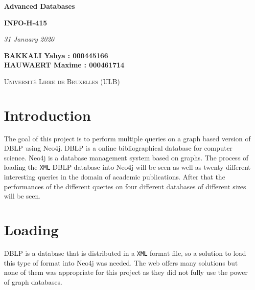 \documentclass{article}
\begin{document}
\begin{titlepage}
    \begin{center}
        \vspace*{1cm}


        \Huge
        \textbf{Advanced Databases}
        \vspace{0.25cm}

        \LARGE
        \textbf{INFO-H-415}

        \vspace{0.25cm}
        \LARGE

        \vspace{0.25cm}
        \textit{31 January 2020}

        \vspace{3cm}
           \Large
        \textbf{BAKKALI Yahya : 000445166 \\}
        \textbf{HAUWAERT Maxime : 000461714 \\}

        \vspace{2cm}

        \textsc{Université Libre de Bruxelles (ULB)}


    \end{center}
\end{titlepage}

\tableofcontents
\newpage


\section{Introduction}
The goal of this project is to perform multiple queries on a graph based version of DBLP using Neo4j. DBLP is a online bibliographical database for computer science. Neo4j is a database management system based on graphs. The process of loading the \texttt{XML} DBLP database into Neo4j will be seen as well as twenty different interesting queries in the domain of academic publications. After that the performances of the different queries on four different databases of different sizes will be seen.

\section{Loading}
DBLP is a database that is distributed in a \texttt{XML} format file, so a solution to load this type of format into Neo4j was needed. The web offers many solutions but none of them was appropriate for this project as they did not fully use the power of graph databases.
\end{document}
